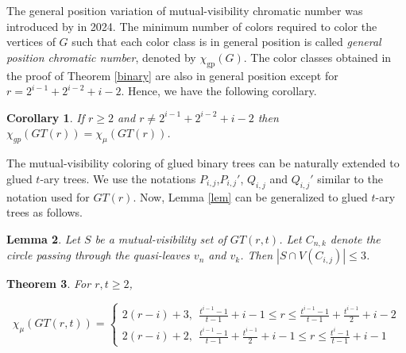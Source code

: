 \documentclass[12pt]{article}
\newtheorem{theorem}{Theorem}[section]
\newtheorem{lemma}[theorem]{Lemma}
\newtheorem{corollary}[theorem]{Corollary}
\begin{document}
The general position variation of mutual-visibility chromatic number was introduced by \cite{MVC3} in 2024. The minimum number of colors required to color the vertices of $G$ such that each color class is in general position is called \textit{general position chromatic number}, denoted by $\chi_{\text{gp}}(G)$. The color classes obtained in the proof of Theorem \ref{binary} are also in general position except for $r=2^{i-1} + 2^{i-2} + i - 2$. Hence, we have the following corollary.

\begin{corollary}
    If $r \geq 2$ and $r \neq 2^{i-1} + 2^{i-2} + i - 2$ then $\chi_{gp}(GT(r))=\chi_{\mu}(GT(r))$.
\end{corollary}

The mutual-visibility coloring of glued binary trees can be naturally extended to glued $t$-ary trees. We use the notations $P_{i,j}$,$P_{i,j}'$, $Q_{i,j}$ and $Q_{i,j}'$ similar to the notation used for $GT(r)$. Now, Lemma \ref{lem} can be generalized to glued $t$-ary trees as follows.
\begin{lemma} \label{lemma}
	Let $S$ be a mutual-visibility set of $GT(r,t)$. Let $C_{n,k}$ denote the circle passing through the quasi-leaves $v_n$ and $v_k$. Then $|{S \cap V(C_{i,j}) }| \leq 3$.
\end{lemma}
        
	\begin{theorem}
		For $r, t \geq 2$,
		
		$$\chi_\mu(GT(r,t))=
		\begin{cases}
			2(r-i)+3,~ ~ \frac{t^{i-1}-1}{t-1}+i-1 \leq r \leq \frac{t^{i-1}-1}{t-1}+\frac{t^{i-1}}{2}+i-2\\
            2(r-i)+2,~ ~ \frac{t^{i-1}-1}{t-1} +\frac{t^{i-1}}{2}+i-1 \leq r \leq \frac{t^i-1}{t-1}+i-1
			
		\end{cases}$$
		\end{theorem} 
        
\end{document}
